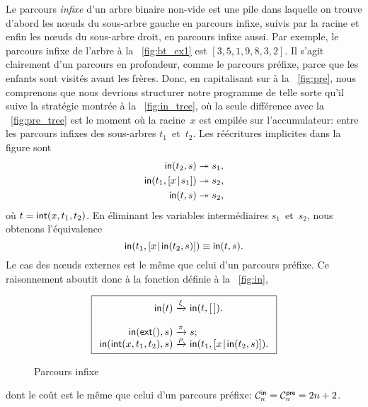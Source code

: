 Le parcours \emph{infixe} d'un arbre binaire non-vide est une pile
dans laquelle on trouve d'abord les nœuds du sous-arbre gauche en
parcours infixe, suivis par la racine et enfin les nœuds du
sous-arbre droit, en parcours infixe aussi. Par exemple, le parcours
infixe de l'arbre à la \fig~\vref{fig:bt_ex1} est
\([3,5,1,9,8,3,2]\). Il s'agit clairement d'un parcours en profondeur,
comme le parcours préfixe, parce que les enfants sont visités avant
les frères. Donc, en capitalisant sur
 à la \fig~\vref{fig:pre}, nous
comprenons que nous devrions structurer notre programme de telle sorte
qu'il suive la stratégie montrée à la \fig~\vref{fig:in_tree}, où la
seule différence avec la \fig~\ref{fig:pre_tree} est le moment où la
racine~\(x\) est empilée sur l'accumulateur: entre les parcours infixes des
sous-arbres \(t_1\)~et~\(t_2\). Les réécritures implicites dans la
figure sont
\begin{align*}
  \fun{in}(t_2,s) &\twoheadrightarrow s_1,\index{in@\fun{in/2}}\\
  \fun{in}(t_1,\cons{x}{s_1}) &\twoheadrightarrow s_2,\\
  \fun{in}(t,s) &\twoheadrightarrow s_2,
\end{align*}
où \(t=\fun{int}(x,t_1,t_2)\). En éliminant les variables
intermédiaires \(s_1\)~et~\(s_2\), nous obtenons l'équivalence
\begin{equation*}
  \fun{in}(t_1,\cons{x}{\fun{in}(t_2,s)}) \equiv \fun{in}(t,s).
\end{equation*}
Le cas des nœuds externes est le même que celui d'un parcours
préfixe. Ce raisonnement aboutit donc à la fonction définie à la
\fig~\vref{fig:in},
\begin{figure}
\begin{equation*}
\boxed{
\begin{array}{r@{\;}c@{\;}l}
\fun{in}(t) & \xrightarrow{\xi} & \fun{in}(t,\el).\\
\\
\fun{in}(\fun{ext}(),s) & \xrightarrow{\smash{\pi}} & s;\\
\fun{in}(\fun{int}(x,t_1,t_2),s)
  & \xrightarrow{\smash{\rho}}
  & \fun{in}(t_1,\cons{x}{\fun{in}(t_2,s)}).
\end{array}}
\end{equation*}
\caption{Parcours infixe}
\label{fig:in}
\end{figure}
dont le coût est le même que celui d'un parcours préfixe:
\(\C{\fun{in}}{n} = \C{\fun{pre}}{n} = 2n +
2\).

